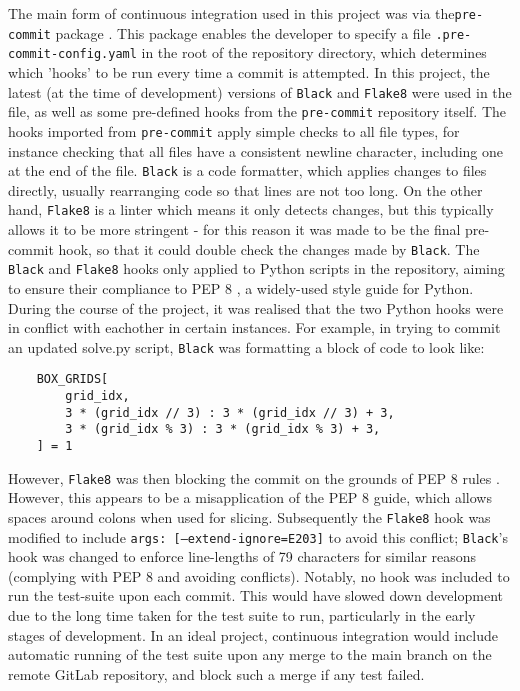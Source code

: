 \documentclass[12pt]{article}
\begin{document}
The main form of continuous integration used in this project was via the\texttt{pre-commit} package \cite{precommit}.
This package enables the developer to specify a file \texttt{.pre-commit-config.yaml} in the root of the repository directory, which determines which 'hooks' to be run every time a commit is attempted.
In this project, the latest (at the time of development) versions of \texttt{Black} \cite{black} and \texttt{Flake8} \cite{flake8} were used in the file, as well as some pre-defined hooks from the \texttt{pre-commit} repository itself.
The hooks imported from \texttt{pre-commit} apply simple checks to all file types, for instance checking that all files have a consistent newline character, including one at the end of the file.
\texttt{Black} is a code formatter, which applies changes to files directly, usually rearranging code so that lines are not too long.
On the other hand, \texttt{Flake8} is a linter which means it only detects changes, but this typically allows it to be more stringent - for this reason it was made to be the final pre-commit hook, so that it could double check the changes made by \texttt{Black}.
The \texttt{Black} and \texttt{Flake8} hooks only applied to Python scripts in the repository, aiming to ensure their compliance to PEP 8 \cite{pep8}, a widely-used style guide for Python.
During the course of the project, it was realised that the two Python hooks were in conflict with eachother in certain instances.
For example, in trying to commit an updated solve.py script, \texttt{Black} was formatting a block of code to look like:
\begin{lstlisting}
    BOX_GRIDS[
        grid_idx,
        3 * (grid_idx // 3) : 3 * (grid_idx // 3) + 3,
        3 * (grid_idx % 3) : 3 * (grid_idx % 3) + 3,
    ] = 1
\end{lstlisting}
However, \texttt{Flake8} was then blocking the commit on the grounds of PEP 8 rules \cite{wspace}. However, this appears to be a misapplication of the PEP 8 guide, which allows spaces around colons when used for slicing.
Subsequently the \texttt{Flake8} hook was modified to include \texttt{args: [--extend-ignore=E203]} to avoid this conflict; \texttt{Black}'s hook was changed to enforce line-lengths of 79 characters for similar reasons (complying with PEP 8 and avoiding conflicts).
Notably, no hook was included to run the test-suite upon each commit.
This would have slowed down development due to the long time taken for the test suite to run, particularly in the early stages of development.
In an ideal project, continuous integration would include automatic running of the test suite upon any merge to the main branch on the remote GitLab repository, and block such a merge if any test failed.
\end{document}
